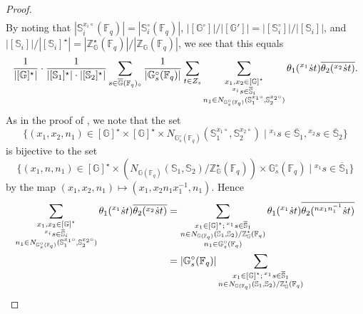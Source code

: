 \documentclass{amsart}
\newcommand{\F}{\mathbb{F}}
\newcommand{\bbS}{\mathbb{S}}
\newcommand{\bbG}{\mathbb{G}}
\newcommand{\bbZ}{\mathbb{Z}}
\theoremstyle{plain}
\theoremstyle{definition}
\theoremstyle{remark}
\theoremstyle{theorem}
\begin{document}
\begin{proof}
\begin{multline*}
\end{multline*}
By noting that $|\bbS_{i}^{x_{i}\circ}(\F_{q})|=|\bbS_{i}^{\circ}(\F_{q})|$, $|[\bbG^{\circ}]|/|[\bbG']|=|[\bbS_{i}^{\circ}]|/|[\bbS_{i}]|$, and $|[\bbS_{i}]|/|[\bbS_{i}]^{\star}|=|\bbZ^{\star}_{\bbG}(\F_{q})|/|\bbZ_{\bbG}(\F_{q})|$, we see that this equals
\[
\frac{1}{|[\bbG]^{\star}|}
\cdot\frac{1}{|[\bbS_{1}]^{\star}|\cdot|[\bbS_{2}]^{\star}|}
\sum_{s\in\overline{\bbG}(\F_{q})_{\circ}}
\frac{1}{|\bbG_{s}^{\circ}(\F_{q})|}
\sum_{t\in Z_{s}}
\sum_{\begin{subarray}{c}x_{1},x_{2}\in[\bbG]^{\star}\\ {}^{x_{i}}s\in\overline{\bbS}_{i} \\ n_{1}\in N_{\bbG_{s}^{\circ}(\F_{q})}(\bbS_{1}^{x_{1}\circ},\bbS_{2}^{x_{2}\circ})\end{subarray}}
\theta_{1}({}^{x_{1}}\dot{s}t)\overline{\theta_{2}({}^{x_{2}}\dot{s}t)}.
\]
As in the proof of \cite[Lemma 6.10]{DL76}, we note that the set 
\[
\{(x_{1},x_{2},n_{1})\in[\bbG]^{\star}\times[\bbG]^{\star}\times N_{\bbG_{s}^{\circ}(\F_{q})}(\bbS_{1}^{x_{1}\circ},\bbS_{2}^{x_{2}\circ})
\mid
{}^{x_{1}}s\in\overline{\bbS}_{1}, {}^{x_{2}}s\in\overline{\bbS}_{2}\}
\]
is bijective to the set
\[
\{(x_{1},n,n_{1})\in [\bbG]^{\star}\times (N_{\bbG(\F_{q})}(\bbS_{1},\bbS_{2})/\bbZ^{\star}_{\bbG}(\F_{q}))\times\bbG_{s}^{\circ}(\F_{q})
\mid
{}^{x_{1}}s\in\overline{\bbS}_{1}\}
\]
by the map $(x_{1},x_{2},n_{1})\mapsto (x_{1},x_{2}n_{1}x_{1}^{-1},n_{1})$.
Hence
\begin{align*}
\sum_{\begin{subarray}{c}x_{1},x_{2}\in[\bbG]^{\star}\\ {}^{x_{i}}s\in\overline{\bbS}_{i} \\ n_{1}\in N_{\bbG_{s}^{\circ}(\F_{q})}(\bbS_{1}^{x_{1}\circ},\bbS_{2}^{x_{2}\circ})\end{subarray}}
\theta_{1}({}^{x_{1}}\dot{s}t)\overline{\theta_{2}({}^{x_{2}}\dot{s}t)}
&=
\sum_{\begin{subarray}{c}x_{1}\in[\bbG]^{\star};\, {}^{x_{1}}s\in\overline{\bbS}_{1} \\ n\in N_{\bbG(\F_{q})}(\bbS_{1},\bbS_{2})/\bbZ^{\star}_{\bbG}(\F_{q})\\ n_{1}\in \bbG_{s}^{\circ}(\F_{q})\end{subarray}}
\theta_{1}({}^{x_{1}}\dot{s}t)\overline{\theta_{2}({}^{nx_{1}n_{1}^{-1}}\dot{s}t)}\\
&=
|\bbG_{s}^{\circ}(\F_{q})|
\sum_{\begin{subarray}{c}x_{1}\in[\bbG]^{\star};\, {}^{x_{1}}s\in\overline{\bbS}_{1} \\ n\in N_{\bbG(\F_{q})}(\bbS_{1},\bbS_{2})/\bbZ^{\star}_{\bbG}(\F_{q})\end{subarray}}

\end{align*}
\end{proof}
\end{document}
